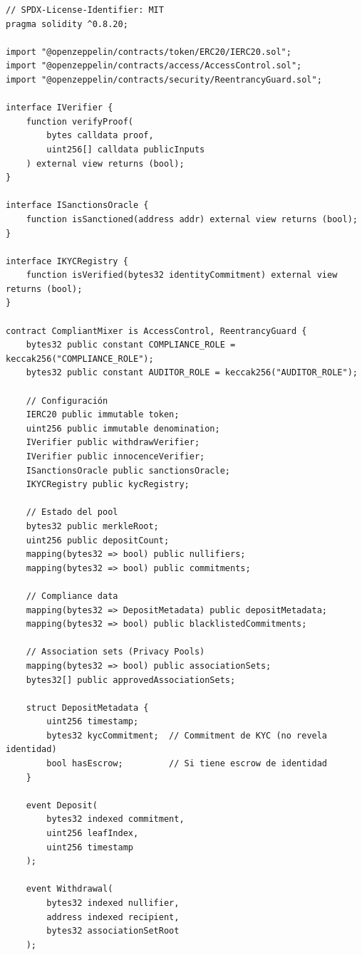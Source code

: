 \documentclass[11pt,a4paper,twoside]{book}
\theoremstyle{definition}
\theoremstyle{remark}
\begin{document}
\begin{lstlisting}[language=Solidity, caption={Regulatory-Compliant Mixer Contract}]
// SPDX-License-Identifier: MIT
pragma solidity ^0.8.20;

import "@openzeppelin/contracts/token/ERC20/IERC20.sol";
import "@openzeppelin/contracts/access/AccessControl.sol";
import "@openzeppelin/contracts/security/ReentrancyGuard.sol";

interface IVerifier {
    function verifyProof(
        bytes calldata proof,
        uint256[] calldata publicInputs
    ) external view returns (bool);
}

interface ISanctionsOracle {
    function isSanctioned(address addr) external view returns (bool);
}

interface IKYCRegistry {
    function isVerified(bytes32 identityCommitment) external view returns (bool);
}

contract CompliantMixer is AccessControl, ReentrancyGuard {
    bytes32 public constant COMPLIANCE_ROLE = keccak256("COMPLIANCE_ROLE");
    bytes32 public constant AUDITOR_ROLE = keccak256("AUDITOR_ROLE");
    
    // Configuración
    IERC20 public immutable token;
    uint256 public immutable denomination;
    IVerifier public withdrawVerifier;
    IVerifier public innocenceVerifier;
    ISanctionsOracle public sanctionsOracle;
    IKYCRegistry public kycRegistry;
    
    // Estado del pool
    bytes32 public merkleRoot;
    uint256 public depositCount;
    mapping(bytes32 => bool) public nullifiers;
    mapping(bytes32 => bool) public commitments;
    
    // Compliance data
    mapping(bytes32 => DepositMetadata) public depositMetadata;
    mapping(bytes32 => bool) public blacklistedCommitments;
    
    // Association sets (Privacy Pools)
    mapping(bytes32 => bool) public associationSets;
    bytes32[] public approvedAssociationSets;
    
    struct DepositMetadata {
        uint256 timestamp;
        bytes32 kycCommitment;  // Commitment de KYC (no revela identidad)
        bool hasEscrow;         // Si tiene escrow de identidad
    }
    
    event Deposit(
        bytes32 indexed commitment,
        uint256 leafIndex,
        uint256 timestamp
    );
    
    event Withdrawal(
        bytes32 indexed nullifier,
        address indexed recipient,
        bytes32 associationSetRoot
    );
    

\end{lstlisting}
\end{document}
